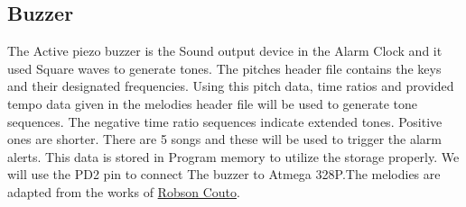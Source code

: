 \begin{minipage}{0.97\textwidth}
 \noindent{}\hfill
\end{minipage}




\subsection{Buzzer}

The Active piezo buzzer is the Sound output device in the Alarm Clock and it used Square waves to generate tones. The pitches header file contains the keys and their designated frequencies. Using this pitch data, time ratios and provided tempo data given in the melodies header file will be used to generate tone sequences. The negative time ratio sequences indicate extended tones. Positive ones are shorter. There are 5 songs and these will be used to trigger the alarm alerts. This data is stored in Program memory to utilize the storage properly. We will use the PD2 pin to connect The buzzer to Atmega 328P.The melodies are adapted from the works of \href{https://github.com/robsoncouto}{Robson Couto}.


